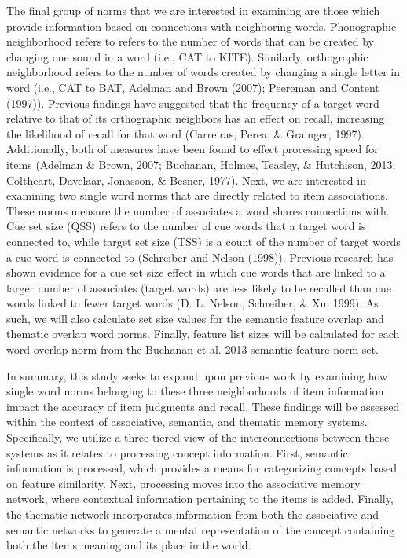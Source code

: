 \documentclass[english,man]{apa6}
\theoremstyle{definition}
\theoremstyle{definition}
\theoremstyle{definition}
\theoremstyle{remark}
\begin{document}
The final group of norms that we are interested in examining are those
which provide information based on connections with neighboring words.
Phonographic neighborhood refers to refers to the number of words that
can be created by changing one sound in a word (i.e., CAT to KITE).
Similarly, orthographic neighborhood refers to the number of words
created by changing a single letter in word (i.e., CAT to BAT, Adelman
and Brown (2007); Peereman and Content (1997)). Previous findings have
suggested that the frequency of a target word relative to that of its
orthographic neighbors has an effect on recall, increasing the
likelihood of recall for that word (Carreiras, Perea, \& Grainger,
1997). Additionally, both of measures have been found to effect
processing speed for items (Adelman \& Brown, 2007; Buchanan, Holmes,
Teasley, \& Hutchison, 2013; Coltheart, Davelaar, Jonasson, \& Besner,
1977). Next, we are interested in examining two single word norms that
are directly related to item associations. These norms measure the
number of associates a word shares connections with. Cue set size (QSS)
refers to the number of cue words that a target word is connected to,
while target set size (TSS) is a count of the number of target words a
cue word is connected to (Schreiber and Nelson (1998)). Previous
research has shown evidence for a cue set size effect in which cue words
that are linked to a larger number of associates (target words) are less
likely to be recalled than cue words linked to fewer target words (D. L.
Nelson, Schreiber, \& Xu, 1999). As such, we will also calculate set
size values for the semantic feature overlap and thematic overlap word
norms. Finally, feature list sizes will be calculated for each word
overlap norm from the Buchanan et al. 2013 semantic feature norm set.

In summary, this study seeks to expand upon previous work by examining
how single word norms belonging to these three neighborhoods of item
information impact the accuracy of item judgments and recall. These
findings will be assessed within the context of associative, semantic,
and thematic memory systems. Specifically, we utilize a three-tiered
view of the interconnections between these systems as it relates to
processing concept information. First, semantic information is
processed, which provides a means for categorizing concepts based on
feature similarity. Next, processing moves into the associative memory
network, where contextual information pertaining to the items is added.
Finally, the thematic network incorporates information from both the
associative and semantic networks to generate a mental representation of
the concept containing both the items meaning and its place in the
world.
\end{document}
